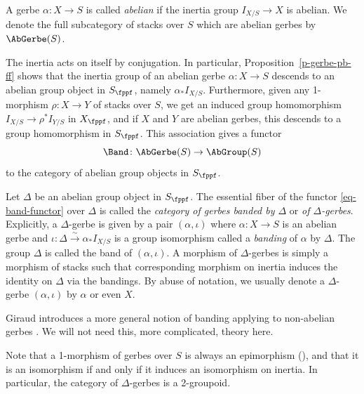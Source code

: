 \begin{definition}
A gerbe $\alpha\colon X \to S$ is called \emph{abelian} if the inertia group $I_{X/S} \to X$
is abelian.
We denote the full subcategory of stacks over $S$ which are abelian gerbes by
$\AbGerbe(S)$.
\end{definition}

The inertia acts on itself by conjugation.
In particular, Proposition~\ref{p-gerbe-pb-ff} shows that the inertia group of an abelian gerbe $\alpha\colon X \to S$
descends to an abelian
group object in $S_\fppf$, namely $\alpha_* I_{X/S}$.
Furthermore, given any 1-morphism $\rho\colon X \to Y$ of stacks over $S$,
we get an induced group homomorphism $I_{X/S} \to \rho^*I_{Y/S}$ in $X_\fppf$,
and if $X$ and $Y$ are abelian gerbes, this descends to a group homomorphism in $S_\fppf$.
This association gives a functor
\begin{equation}
\label{eq-band-functor}
\Band\colon \AbGerbe(S) \to \AbGroup(S)
\end{equation}
to the category of abelian group objects in $S_\fppf$.

\begin{definition}
\label{def-banding}
Let $\Delta$ be an abelian group object in $S_\fppf$.
The essential fiber of the functor \eqref{eq-band-functor} over $\Delta$ is called
the \emph{category of gerbes banded by $\Delta$} or \emph{of $\Delta$-gerbes}. 
Explicitly, a $\Delta$-gerbe is given by a pair $(\alpha, \iota)$ where $\alpha\colon X \to S$ is an abelian
gerbe and $\iota\colon \Delta \xrightarrow{\sim} \alpha_*I_{X/S}$ is a group isomorphism
called a \emph{banding} of $\alpha$ by $\Delta$.
The group $\Delta$ is called the band of $(\alpha,\iota)$.
A morphism of $\Delta$-gerbes is simply a morphism of stacks such that corresponding morphism on inertia
induces the identity on $\Delta$ via the bandings.
By abuse of notation, we usually denote a $\Delta$-gerbe $(\alpha, \iota)$ by $\alpha$ or even $X$.
\end{definition}

\begin{remark}
Giraud introduces a more general notion of banding applying to non-abelian gerbes
\cite[Chapter~IV]{giraud1971}.
We will not need this, more complicated, theory here.
\end{remark}

Note that a 1-morphism of gerbes over $S$ is always an epimorphism (\cite[Lemma~3.17]{lmb2000}),
and that it is an isomorphism if and only if it induces an isomorphism on inertia.
In particular, the category of $\Delta$-gerbes is a 2-groupoid.

